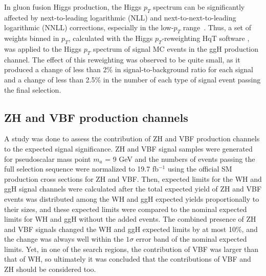 In gluon fusion Higgs production, the Higgs $p_T$ spectrum can be significantly affected by next-to-leading logarithmic (NLL) and next-to-next-to-leading logarithmic (NNLL) corrections, especially in the low-$p_T$ range~\cite{Bozzi:2003jy}. Thus, a set of weights binned in $p_T$, calculated with the Higgs $p_T$-reweighting HqT software \cite{HQTDocumentation}, was applied to the Higgs $p_T$ spectrum of signal MC events in the ggH production channel. The effect of this reweighting was observed to be quite small, as it produced a change of less than 2\% in signal-to-background ratio for each signal and a change of less than 2.5\% in the number of each type of signal event passing the final selection.

\subsection{ZH and VBF production channels\label{sec:datasets-zhvbf}}

A study was done to assess the contribution of ZH and VBF production channels to the expected signal significance. ZH and VBF signal samples were generated for pseudoscalar mass point $m_{a}$ = 9 GeV and the numbers of events passing the full selection sequence were normalized to 19.7 fb$^{-1}$ using the official SM production cross sections for ZH and VBF. Then, expected limits for the WH and ggH signal channels were calculated after the total expected yield of ZH and VBF events was distributed among the WH and ggH expected yields proportionally to their sizes, and these expected limits were compared to the nominal expected limits for WH and ggH without the added events. The combined presence of ZH and VBF signals changed the WH and ggH expected limits by at most 10\%, and the change was always well within the $1\sigma$ error band of the nominal expected limits. Yet, in one of the search regions, the contribution of VBF was larger than that of WH, so ultimately it was concluded that the contributions of VBF and ZH should be considered too.

